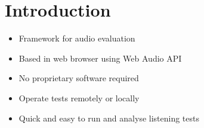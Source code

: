 \vspace{-0.8cm}
\section{Introduction}

\begin{itemize}%
	\item Framework for audio evaluation
	\item Based in web browser using Web Audio API
	\item No proprietary software required
	\item Operate tests remotely or locally
	\item Quick and easy to run and analyse listening tests
\end{itemize}